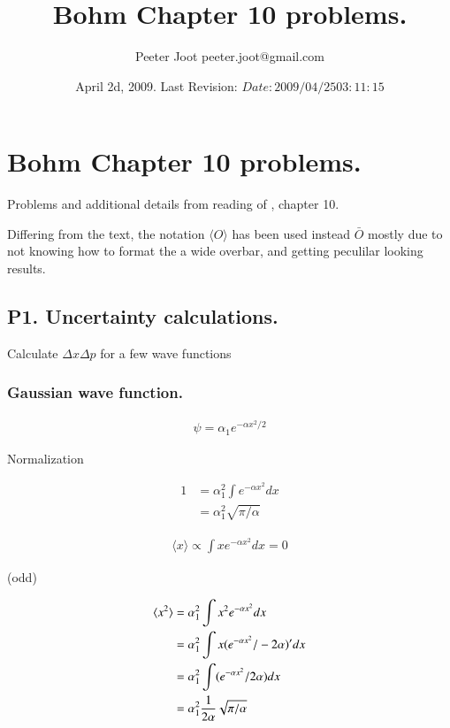 \documentclass{article}
\title{ Bohm Chapter 10 problems. }
\author{Peeter Joot \quad peeter.joot@gmail.com }
\date{ April 2d, 2009.  Last Revision: $Date: 2009/04/25 03:11:15 $ }
\newcommand{\expectation}[1]{\langle{#1}\rangle}
\begin{document}
\maketitle{}
\tableofcontents
\section{ Bohm Chapter 10 problems. }

Problems and additional details from reading of \cite{bohm1989qt}, chapter 10.

Differing from the text, the notation $\expectation{O}$ has been used instead $\bar{O}$ mostly due to not knowing how to format the a wide overbar, and getting peculilar looking results.

\subsection{ P1. Uncertainty calculations. }

Calculate $\Delta x \Delta p$ for a few wave functions

\subsubsection{ Gaussian wave function. }

\begin{align*}
\psi = \alpha_1 e^{-\alpha x^2/2}
\end{align*}

Normalization

\begin{align*}
1 
&= \alpha_1^2 \int e^{-\alpha x^2} dx \\
&= \alpha_1^2 \sqrt{\pi/\alpha}
\end{align*}

\begin{align*}
\expectation{x} \propto \int x e^{-\alpha x^2} dx = 0
\end{align*}

(odd)

\begin{align*}
\expectation{x^2} 
&= \alpha_1^2 \int x^2 e^{-\alpha x^2} dx \\
&= \alpha_1^2 \int x (e^{-\alpha x^2}/-2\alpha)' dx \\
&= \alpha_1^2 \int (e^{-\alpha x^2}/2\alpha) dx \\
&= \alpha_1^2 \inv{2\alpha} \sqrt{\pi/\alpha}
\end{align*}
\end{document}
